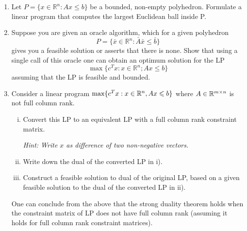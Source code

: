\documentclass[11pt]{article}
\institute{\'Ecole Polytechnique F\'ed\'erale de Lausanne}
\newcommand{\setR}{\mathbb{R}}
\renewcommand{\leq}{\leqslant}
\begin{document}
\makeheader

\begin{enumerate}[1)]

\item Let $P= \{x ∈\setR^n : Ax ≤b\}$ be a bounded, non-empty polyhedron. Formulate a linear program that
computes the largest Euclidean ball inside P.

\item Suppose you are given an oracle algorithm, which for a given polyhedron
$$P= \{\bar{x}∈\setR^n: \bar{A}\bar{x} \leq \bar{b}\}$$
gives you a feasible solution or asserts that there is none. Show that using a single call of this oracle
one can obtain an optimum solution for the LP
$$\max\{c^T x : x∈\setR^n; Ax≤b\}$$
assuming that the LP is feasible and bounded.







\item Consider a linear program $\max\{c^Tx: x\in \R^n, Ax\leq b\}$ where $A\in \mathbb{R}^{m\times n}$ is not full column rank. 
\begin{enumerate}[i)]
\item Convert this LP to an equivalent LP with a full column rank constraint matrix. 

\emph{Hint: Write $x$ as difference of two non-negative vectors.}

\item Write down the dual of the converted LP in i).
\item Construct a feasible solution to dual of the original LP, based on a given feasible solution to the dual of the converted LP in ii).
\end{enumerate}
One can conclude from the above that the strong duality theorem holds when the constraint matrix of LP does not have full column rank (assuming it holds for full column rank constraint matrices).



\end{enumerate}
\end{document}
